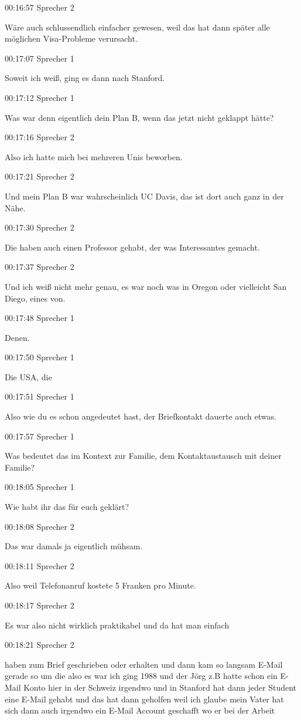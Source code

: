 00:16:57 Sprecher 2

Wäre auch schlussendlich einfacher gewesen, weil das hat dann später
alle möglichen Visa-Probleme verursacht.

00:17:07 Sprecher 1

Soweit ich weiß, ging es dann nach Stanford.

00:17:12 Sprecher 1

Was war denn eigentlich dein Plan B, wenn das jetzt nicht geklappt
hätte?

00:17:16 Sprecher 2

Also ich hatte mich bei mehreren Unis beworben.

00:17:21 Sprecher 2

Und mein Plan B war wahrscheinlich UC Davis, das ist dort auch ganz in
der Nähe.

00:17:30 Sprecher 2

Die haben auch einen Professor gehabt, der was Interessantes gemacht.

00:17:37 Sprecher 2

Und ich weiß nicht mehr genau, es war noch was in Oregon oder vielleicht
San Diego, eines von.

00:17:48 Sprecher 1

Denen.

00:17:50 Sprecher 1

Die USA, die

00:17:51 Sprecher 1

Also wie du es schon angedeutet hast, der Briefkontakt dauerte auch
etwas.

00:17:57 Sprecher 1

Was bedeutet das im Kontext zur Familie, dem Kontaktaustausch mit deiner
Familie?

00:18:05 Sprecher 1

Wie habt ihr das für euch geklärt?

00:18:08 Sprecher 2

Das war damals ja eigentlich mühsam.

00:18:11 Sprecher 2

Also weil Telefonanruf kostete 5 Franken pro Minute.

00:18:17 Sprecher 2

Es war also nicht wirklich praktikabel und da hat man einfach

00:18:21 Sprecher 2

haben zum Brief geschrieben oder erhalten und dann kam so langsam E-Mail
gerade so um die also es war ich ging 1988 und der Jörg z.B hatte schon
ein E-Mail Konto hier in der Schweiz irgendwo und in Stanford hat dann
jeder Student eine E-Mail gehabt und das hat dann geholfen weil ich
glaube mein Vater hat sich dann auch irgendwo ein E-Mail Account
geschafft wo er bei der Arbeit

